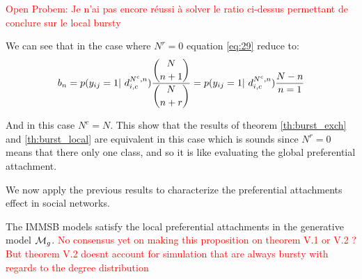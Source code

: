 \textcolor{red}{Open Probem:  Je n'ai pas encore réussi à solver le ratio ci-dessus permettant de conclure sur le local bursty}


We can see that in the case where $N^r=0$ equation \eqref{eq:29} reduce to:
\begin{equation}
b_n = p(y_{ij}=1 | d_{i,c}^{N^c,n}) \frac{\dbinom{N}{n+1}}{ \dbinom{N}{n+r} } =  p(y_{ij}=1 | d_{i,c}^{N^c,n}) \frac{N-n}{n=1}
\end{equation}

And in this case $N^c=N$. This show that the results of theorem \ref{th:burst_exch} and \ref{th:burst_local} are equivalent in this case which is sounds since $N^r=0$ means that there only one class, and so it is like evaluating the global preferential attachment.

We now apply the previous results to characterize the preferential attachments effect in social networks.


\begin{proposition}
	The IMMSB models satisfy the local preferential attachments in the generative model $\mathcal{M}_g$. \textcolor{red}{No consensus yet on making this proposition on theorem V.1 or V.2 ? But theorem V.2 doesnt account for simulation that are always bursty with regards to the degree distribution}
\end{proposition}


